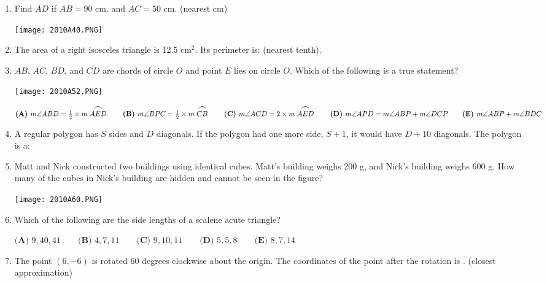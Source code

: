 \documentclass[../uilmath.tex]{subfiles}
\begin{document}
\begin{enumerate}[label=\bfseries\arabic*.]
    \item %
    Find $AD$ if $AB=90$ cm. and $AC=50$ cm. (nearest cm)
    \begin{center}
        \texttt{[image: 2010A40.PNG]}
    \end{center}

    \item %
    The area of a right isosceles triangle is 12.5 cm$^2$. Its perimeter is: (nearest tenth).

    \item %
    $\overline{AB}$, $\overline{AC}$, $\overline{BD}$, and $\overline{CD}$ are chords of circle $O$ and point $E$ lies on circle $O$. Which of the following is a true statement?
    \begin{center}
        \texttt{[image: 2010A52.PNG]}
    \end{center}

    $\textbf{(A) } m\angle ABD = \frac{1}{2}\times m\stackrel{\mbox{\large$\frown$}}{AED} \qquad \textbf{(B) } m\angle BPC = \frac{1}{2}\times m\stackrel{\mbox{\large$\frown$}}{CB} \qquad \textbf{(C) } m\angle ACD = 2\times m\stackrel{\mbox{\large$\frown$}}{AED} \qquad \textbf{(D) }m\angle APD = m\angle ABP + m\angle DCP \qquad \textbf{(E) } m\angle ABP + m\angle BDC$

    \item %
    A regular polygon has $S$ sides and $D$ diagonals. If the polygon had one more side, $S+1$, it would have $D+10$ diagonals. The polygon is a:

    \item %
    Matt and Nick constructed two buildings using identical cubes. Matt's building weighs 200 g, and Nick's building weighs 600 g. How many of the cubes in Nick's building are hidden and cannot be seen in the figure?
    \begin{center}
        \texttt{[image: 2010A60.PNG]}
    \end{center}

    \item %
    Which of the following are the side lengths of a scalene acute triangle?

    $\textbf{(A) } 9,40,41 \qquad \textbf{(B) } 4,7,11 \qquad \textbf{(C) } 9,10,11 \qquad \textbf{(D) } 5,5,8 \qquad \textbf{(E) } 8,7,14$

    \item %
    The point $(6,-6)$ is rotated 60 degrees clockwise about the origin. The coordinates of the point after the rotation is \blank . (closest approximation)


\end{enumerate}
\end{document}
